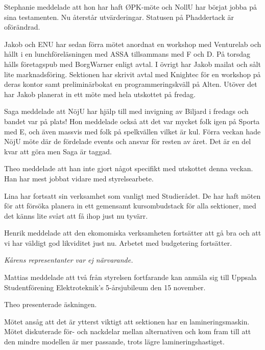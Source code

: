 \documentclass[10pt]{article}
\begin{document}
\begin{paragrafer}
\begin{paragrafer}
Stephanie meddelade att hon har haft ØPK-möte och NollU har börjat jobba på sina testamenten. Nu återstår utvärderingar. Statusen på Phaddertack är oförändrad. 

Jakob och ENU har sedan förra mötet anordnat en workshop med Venturelab och hållt i en lunchföreläsningen med ASSA tillsammans med F och D. På torsdag hålls företagspub med BorgWarner enligt avtal. I övrigt har Jakob mailat och sålt lite marknadsföring. 
Sektionen har skrivit avtal med Knightec för en workshop på deras kontor samt preliminärbokat en programmeringskväll på Alten. Utöver det har Jakob planerat in ett möte med hela utskottet på fredag.

Saga meddelade att NöjU har hjälp till med invigning av Biljard i fredags och bandet var på plats! Hon meddelade också att det var mycket folk igen på Sporta med E, och även massvis med folk på spelkvällen vilket är kul. Förra veckan hade NöjU möte där de fördelade events och ansvar för resten av året. Det är en del kvar att göra men Saga är taggad.

Theo meddelade att han inte gjort något specifikt med utskottet denna veckan. Han har mest jobbat vidare med styrelsearbete.

Lina har fortsatt sin verksamhet som vanligt med Studierådet. De har haft möten för att försöka planera in ett gemensamt kursombudstack för alla sektioner, med det känns lite svårt att få ihop just nu tyvärr. 

 Henrik meddelade att den ekomomiska verksamheten fortsätter att gå bra och att vi har väldigt god likviditet just nu. Arbetet med budgetering fortsätter. 

\textit{Kårens representanter var ej närvarande.}


Mattias meddelade att två från styrelsen fortfarande kan anmäla sig till Uppsala Studentförening Elektroteknik's 5-årsjubileum den 15 november.

\end{paragrafer}

Theo presenterade äskningen. 

Mötet ansåg att det är ytterst viktigt att sektionen har en lamineringsmaskin. Mötet diskuterade för- och nackdelar mellan alternativen och kom fram till att den mindre modellen är mer passande, trots lägre lamineringshastiget. 


\end{paragrafer}
\end{document}
